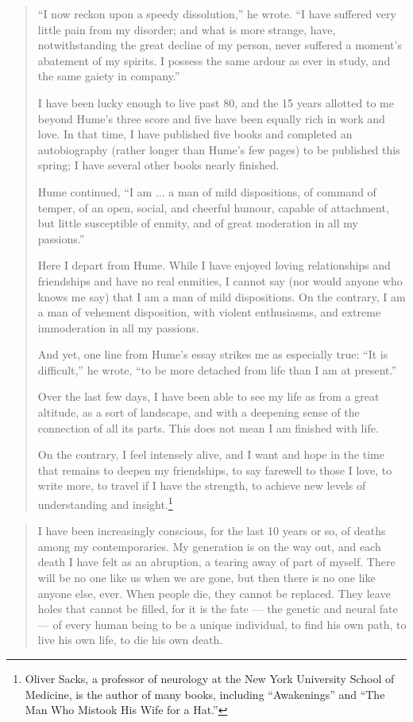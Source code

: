 {\begin{quote}
“I now reckon upon a speedy dissolution,” he wrote. “I have suffered very little pain from my disorder; and what is more strange, have, notwithstanding the great decline of my person, never suffered a moment’s abatement of my spirits. I possess the same ardour as ever in study, and the same gaiety in company.”

I have been lucky enough to live past 80, and the 15 years allotted to me beyond Hume’s three score and five have been equally rich in work and love. In that time, I have published five books and completed an autobiography (rather longer than Hume’s few pages) to be published this spring; I have several other books nearly finished.

Hume continued, “I am ... a man of mild dispositions, of command of temper, of an open, social, and cheerful humour, capable of attachment, but little susceptible of enmity, and of great moderation in all my passions.”

Here I depart from Hume. While I have enjoyed loving relationships and friendships and have no real enmities, I cannot say (nor would anyone who knows me say) that I am a man of mild dispositions. On the contrary, I am a man of vehement disposition, with violent enthusiasms, and extreme immoderation in all my passions.

And yet, one line from Hume’s essay strikes me as especially true: “It is difficult,” he wrote, “to be more detached from life than I am at present.”

Over the last few days, I have been able to see my life as from a great altitude, as a sort of landscape, and with a deepening sense of the connection of all its parts. This does not mean I am finished with life.

On the contrary, I feel intensely alive, and I want and hope in the time that remains to deepen my friendships, to say farewell to those I love, to write more, to travel if I have the strength, to achieve new levels of understanding and insight.\footnote{Oliver Sacks, a professor of neurology at the New York University School of Medicine, is the author of many books, including “Awakenings” and “The Man Who Mistook His Wife for a Hat.”}
\end{quote}

\begin{quote}
I have been increasingly conscious, for the last 10 years or so, of deaths among my contemporaries. My generation is on the way out, and each death I have felt as an abruption, a tearing away of part of myself. There will be no one like us when we are gone, but then there is no one like anyone else, ever. When people die, they cannot be replaced. They leave holes that cannot be filled, for it is the fate — the genetic and neural fate — of every human being to be a unique individual, to find his own path, to live his own life, to die his own death.


\end{quote}}
